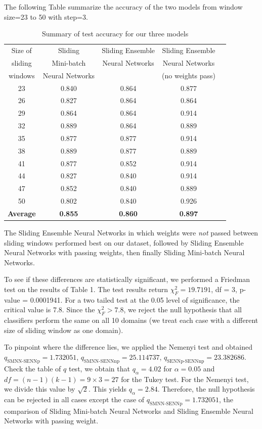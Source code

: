\documentclass[conference]{IEEEtran}
\begin{document}
The following Table summarize the accuracy of the two models from window size=23 to 50 with step=3.
\begin{table}[H]
	\centering
	\begin{tabular}{ccccc}
		\hline
		Size of&  Sliding& Sliding Ensemble& Sliding Ensemble\\
		sliding&  Mini-batch& Neural Networks& Neural Networks\\
		windows&  Neural Networks& & (no weights pass)\\
		\hline
		23 &  0.840 & 0.864 & 0.877 \\ 
		26 &  0.827 & 0.864 & 0.864 \\ 
		29 &  0.864 & 0.864 & 0.914 \\ 
		32 &  0.889 & 0.864 & 0.889 \\ 
		35 &  0.877 & 0.877 & 0.914 \\ 
		38 &  0.889 & 0.877 & 0.889 \\ 
		41 &  0.877 & 0.852 & 0.914 \\ 
		44 &  0.827 & 0.840 & 0.914 \\ 
		47 &  0.852 & 0.840 & 0.889 \\ 
		50 &  0.802 & 0.840 & 0.926 \\ 
		\hline
		\textbf{Average} & \textbf{0.855} &\textbf{0.860} &\textbf{0.897} \\
		\hline
	\end{tabular}
	\caption{Summary of test accuracy for our three models}
\end{table}

The Sliding Ensemble Neural Networks in which weights were \emph{not} passed between sliding windows performed best on our dataset, followed by Sliding Ensemble Neural Networks with passing weights, then finally Sliding Mini-batch Neural Networks.

To see if these differences are statistically significant, we performed a Friedman test on the results of Table 1. The test results return $\chi^2_F= 19.7191$, df = 3, p-value = 0.0001941. For a two tailed test at the 0.05 level of significance, the critical value is 7.8. Since the $\chi_F^2 >7.8$, we reject the null hypothesis that all classifiers perform the same on all 10 domains (we treat each case with a different size of sliding window as one domain).

To pinpoint where the difference lies, we applied the Nemenyi test and obtained $q_{\text{SMNN-SENNp}}= 1.732051$,  $q_{\text{SMNN-SENNnp}}=25.114737$, $q_{\text{SENNp-SENNnp}}=23.382686$.
Check the table of $q$ test, we obtain that $q_\alpha=4.02$ for $\alpha=0.05$ and $df = (n-1)(k-1) = 9 \times 3 = 27$ for the Tukey test. For the Nemenyi test, we divide this value by $\sqrt{2}$. This yields $q_\alpha = 2.84$. Therefore, the null hypothesis can be rejected in all cases except the case of $q_{\text{SMNN-SENNp}}= 1.732051$, the comparison of Sliding Mini-batch Neural Networks and Sliding Ensemble Neural Networks with passing weight.
\end{document}

